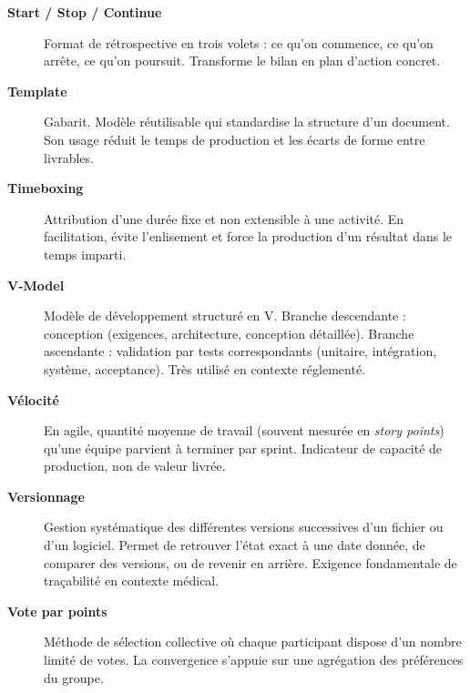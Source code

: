 \begin{description}
  \item[\textbf{Start / Stop / Continue}] Format de rétrospective en trois volets : ce qu'on commence, ce qu'on arrête, ce qu'on poursuit. Transforme le bilan en plan d'action concret.

  \item[\textbf{Template}] Gabarit. Modèle réutilisable qui standardise la structure d'un document. Son usage réduit le temps de production et les écarts de forme entre livrables.

  \item[\textbf{Timeboxing}] Attribution d'une durée fixe et non extensible à une activité. En facilitation, évite l'enlisement et force la production d'un résultat dans le temps imparti.

  \item[\textbf{V-Model}] Modèle de développement structuré en V. Branche descendante : conception (exigences, architecture, conception détaillée). Branche ascendante : validation par tests correspondants (unitaire, intégration, système, acceptance). Très utilisé en contexte réglementé.

  \item[\textbf{Vélocité}] En agile, quantité moyenne de travail (souvent mesurée en \textit{story points}) qu'une équipe parvient à terminer par sprint. Indicateur de capacité de production, non de valeur livrée.

  \item[\textbf{Versionnage}] Gestion systématique des différentes versions successives d'un fichier ou d'un logiciel. Permet de retrouver l'état exact à une date donnée, de comparer des versions, ou de revenir en arrière. Exigence fondamentale de traçabilité en contexte médical.

  \item[\textbf{Vote par points}] Méthode de sélection collective où chaque participant dispose d'un nombre limité de votes. La convergence s'appuie sur une agrégation des préférences du groupe.
\end{description}

